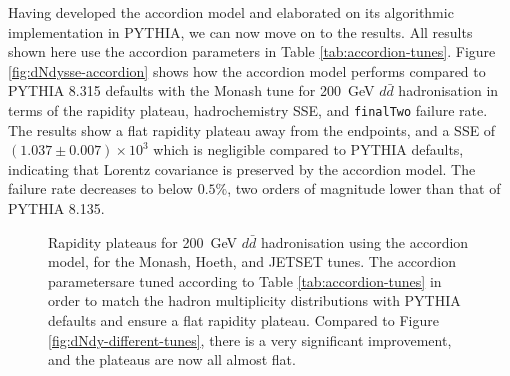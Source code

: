 \documentclass[12pt,a4paper]{report}
\begin{document}
Having developed the accordion model and elaborated on its algorithmic implementation in PYTHIA, we can now move on to the results. All results shown here use the accordion parameters in Table \ref{tab:accordion-tunes}. Figure \ref{fig:dNdysse-accordion} shows how the accordion model performs compared to PYTHIA 8.315 defaults with the Monash tune for \qty{200}{\giga\electronvolt} $d\bar{d}$ hadronisation in terms of the rapidity plateau, hadrochemistry SSE, and \texttt{finalTwo} failure rate. The results show a flat rapidity plateau away from the endpoints, and a SSE of $(1.037 \pm 0.007) \times 10^3$ which is negligible compared to PYTHIA defaults, indicating that Lorentz covariance is preserved by the accordion model. The failure rate decreases to below $0.5\%$, two orders of magnitude lower than that of PYTHIA 8.135.

\begin{figure}
  \centering
  \begin{minipage}[t]{0.48\linewidth}
    \centering
    
    \caption{The rapidity plateaus for $d\bar{d}$ hadronisation using the accordion model and the Monash tune, across string centre-of-mass energies of 50, 100, 200, and \qty{500}{\giga\electronvolt}. Compared to Figure \ref{fig:dNdy-string-masses}, the distributions for all string masses are significantly flatter, although not perfectly flat, owing to imperfections in the matching of $\Delta y$ distributions for the final two hadrons.}
    \label{fig:dNdy-accordion-stringmasses}
  \end{minipage}
  \hfill
  \begin{minipage}[t]{0.48\linewidth}
    \centering
    
    \caption{Rapidity plateaus for \qty{200}{\giga\electronvolt} $d\bar{d}$ hadronisation using the accordion model, for the Monash, Hoeth, and JETSET tunes. The accordion parametersare tuned according to Table \ref{tab:accordion-tunes} in order to match the hadron multiplicity distributions with PYTHIA defaults and ensure a flat rapidity plateau. Compared to Figure \ref{fig:dNdy-different-tunes}, there is a very significant improvement, and the plateaus are now all almost flat.}
    \label{fig:dNdy-accordion-differenttunes}
  \end{minipage}
\end{figure}
\end{document}
